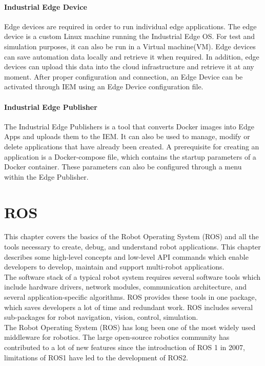 		\paragraph{Industrial Edge Device}
		Edge devices are required in order to run individual edge applications. The edge device is a custom Linux machine running the Industrial Edge OS. For test and simulation purposes, it can also be run in a Virtual machine(VM). Edge devices can save automation data locally and retrieve it when required. In addition, edge devices can upload this data into the cloud infrastructure and retrieve it at any moment. After proper configuration and connection,  an Edge Device can be activated through IEM using an Edge Device configuration file.
			
		\paragraph{Industrial Edge Publisher}
		The Industrial Edge Publishers is a tool that converts Docker images into Edge Apps and uploads them to the IEM. It can also be used to manage, modify or delete applications that have already been created.\cite{siemensIE_App} A prerequisite for creating an application is a Docker-compose file, which contains the startup parameters of a Docker container. These parameters can also be configured through a menu within the Edge Publisher.
			

	
	\section{ROS}
	\label{Grundlagen:ROS2}		
	This chapter covers the basics of the Robot Operating System (ROS) and all the tools necessary to create, debug, and understand robot applications. This chapter describes some high-level concepts and low-level API commands which enable developers to develop, maintain and support multi-robot applications. \\
	
	The software stack of a typical robot system requires several software tools which include hardware drivers, network modules, communication architecture, and several application-specific algorithms. ROS provides these tools in one package, which saves developers a lot of time and redundant work. ROS includes several sub-packages for robot navigation, vision, control, simulation.\\
	
	The Robot Operating System (ROS) has long been one of the most widely used middleware for robotics. The large open-source robotics community has contributed to a lot of new features since the introduction of ROS 1 in 2007, limitations of ROS1 have led to the development of ROS2.\cite{ros2Basic}\\

